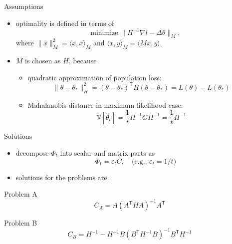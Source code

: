 \documentclass[fleqn,aspectratio=1610]{beamer}
\begin{document}
\begin{frame}[label={sec:org764298a}]{Assumptions}
\begin{itemize}
\item optimality is defined in terms of
\begin{equation}
  \text{minimize}\;\|H^{-1}\nabla l-\varDelta\theta\|_{M},
\end{equation}
where 
\(\|x\|_{M}^{2}=\langle x,x\rangle_{M}\)
and 
\(\langle x,y\rangle_{M}=\langle Mx,y\rangle\).
\item \(M\) is chosen as \(H\), because
\begin{itemize}
\item quadratic approximation of population loss:
\begin{equation}
  \|\theta-\theta_{*}\|_{H}^{2}
  =(\theta-\theta_{*})^{\mathsf{T}}H(\theta-\theta_{*})
  =L(\theta)-L(\theta_{*})
\end{equation}
\item Mahalanobis distance in maximum likelihood case:
\begin{equation}
  \mathbb{V}[\hat\theta_{t}]
  =\frac{1}{t}H^{-1}GH^{-1}
  =\frac{1}{t}H^{-1}
\end{equation}
\end{itemize}
\end{itemize}
\end{frame}
\begin{frame}[label={sec:orgfa76d9f}]{Solutions}
\begin{itemize}
\item decompose \(\varPhi_{t}\) into scalar and matrix parts as
\begin{equation}
  \varPhi_{t}=\varepsilon_{t} C,\quad\text{(e.g., \(\varepsilon_{t}=1/t\))}
\end{equation}
\item solutions for the problems are:
\end{itemize}
\begin{block}{Problem A}
\begin{equation}
  C_{A}=A(A^{\mathsf{T}}HA)^{-1}A^{\mathsf{T}}
\end{equation}
\end{block}
\begin{block}{Problem B}
\begin{equation}
  C_{B}=H^{-1}-H^{-1}B(B^{\mathsf{T}}H^{-1}B)^{-1}B^{\mathsf{T}}H^{-1}
\end{equation}
\end{block}
\end{frame}
\end{document}
